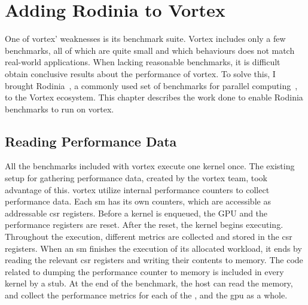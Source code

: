 \chapter{Adding Rodinia to Vortex}

One of \Gls{vortex}' weaknesses is its benchmark suite. Vortex includes only a few benchmarks, all of which are quite small and which behaviours does not match real-world applications. When lacking reasonable benchmarks, it is difficult obtain conclusive results about the performance of \Gls{vortex}. To solve this, I brought Rodinia~\cite{rodinia, rodinia_characterization}, a commonly used set of benchmarks for parallel computing~\cite{cactus}, to the Vortex ecosystem. This chapter describes the work done to enable Rodinia benchmarks to run on \Gls{vortex}. 


\section{Reading Performance Data} \label{sec:reading_perf}

All the benchmarks included with \Gls{vortex} execute one kernel once. The existing setup for gathering performance data, created by the \Gls{vortex} team, took advantage of this. \Gls{vortex} utilize internal performance counters to collect performance data. Each \acrshort{sm} has its own counters, which are accessible as addressable \acrshort{csr} registers. Before a kernel is enqueued, the GPU and the performance registers are reset. After the reset, the kernel begins executing. Throughout the execution, different metrics are collected and stored in the \acrshort{csr} registers. When an \acrshort{sm} finishes the execution of its allocated workload, it ends by reading the relevant \acrshort{csr} registers and writing their contents to memory. The code related to dumping the performance counter to memory is included in every kernel by a stub. At the end of the benchmark, the host can read the memory, and collect the performance metrics for each of the , and the \acrshort{gpu} as a whole.

